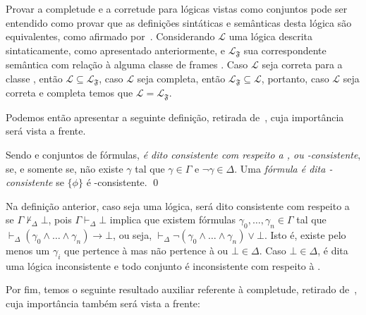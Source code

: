         Provar a completude e a corretude para lógicas vistas como conjuntos pode ser entendido como provar que as definições sintáticas e semânticas desta lógica são
        equivalentes, como afirmado por~. Considerando \(\mathcal{L}\) uma lógica descrita sintaticamente, como apresentado anteriormente,
        e \(\mathcal{L}_{\mathfrak{F}}\) sua correspondente semântica com relação à alguma classe de frames . Caso \(\mathcal{L}\) seja correta para a classe ,
        então \(\mathcal{L} \subseteq \mathcal{L}_{\mathfrak{F}}\), caso \(\mathcal{L}\) seja completa, então \(\mathcal{L}_{\mathfrak{F}} \subseteq \mathcal{L}\),
        portanto, caso \(\mathcal{L}\) seja correta e completa temos que \(\mathcal{L} = \mathcal{L}_{\mathfrak{F}}\).

        Podemos então apresentar a seguinte definição, retirada de~, cuja importância será vista a frente.

        \begin{definicao}
            Sendo \GAMMA e \DDELTA conjuntos de fórmulas, \textit{\GAMMA é dito consistente com respeito a \DDELTA, ou \DDELTA-consistente}, se, e somente se,
            não existe \(\gamma\) tal que \(\gamma \in \Gamma \text{ e }\neg \gamma \in \Delta\).
            Uma \textit{fórmula \PHI é dita \DDELTA-consistente} se \(\{\phi\}\) é \DDELTA-consistente. \qed
        \end{definicao}

        Na definição anterior, caso \DDELTA seja uma lógica, \GAMMA será dito consistente com respeito a \DDELTA se \(\Gamma \nvdash_{\Delta} \bot\), pois
        \(\Gamma \vdash_{\Delta} \bot\) implica que existem fórmulas \(\gamma_0, \dots, \gamma_n \in \Gamma\) tal que
        \(\vdash_{\Delta} (\gamma_0 \land \dots \land \gamma_n) \to \bot\), ou seja, \(\vdash_{\Delta} \neg (\gamma_0 \land \dots \land \gamma_n) \lor \bot\).
        Isto é, existe pelo menos um \(\gamma_i\) que pertence à \GAMMA mas não pertence à \DDELTA ou \(\bot \in \Delta\).
        Caso \(\bot \in \Delta\), \DDELTA é dita uma lógica inconsistente e todo conjunto é inconsistente com respeito à \DDELTA.

        Por fim, temos o seguinte resultado auxiliar referente à completude, retirado de~, cuja importância também será vista a frente:

